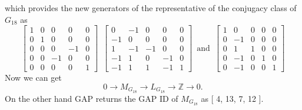 \documentclass{article}
\theoremstyle{plain}
\theoremstyle{definition}
\newcommand{\Z}{\ensuremath{\mathbb{Z}}}
\newcommand{\tand}{\ensuremath{\,\,\, \text{and} \,\,\,}}
\newcommand{\exactseq}[1]{\ensuremath{0 \longrightarrow M_{#1} \longrightarrow L_{#1} \longrightarrow \Z \longrightarrow 0}}
\begin{document}
which provides the new generators of the representative of the conjugacy class of $G_{18}$ as
$$
\left[ \begin {array}{cccc|c} 1&0&0&0&0\\  0&1&0&0&0
\\  0&0&0&-1&0\\  0&0&-1&0&0
\\ \hline 0&0&0&0&1\end {array} \right] 
\,\,\,
 \left[ \begin {array}{cccc|c} 0&-1&0&0&0\\  -1&0&0&0&0
\\  1&-1&-1&0&0\\  -1&1&0&-1&0
\\ \hline -1&1&1&-1&1\end {array} \right] 
\tand
 \left[ \begin {array}{cccc|c} 1&0&0&0&0\\  0&-1&0&0&0
\\  0&1&1&0&0\\  0&-1&0&1&0
\\ \hline 0&-1&0&0&1\end {array} \right] 
$$
Now we can get 
$$\exactseq{G_{18}}.$$
On the other hand GAP returns the GAP ID of $M_{G_{18}}$  as [ 4, 13, 7, 12 ].
\end{document}
